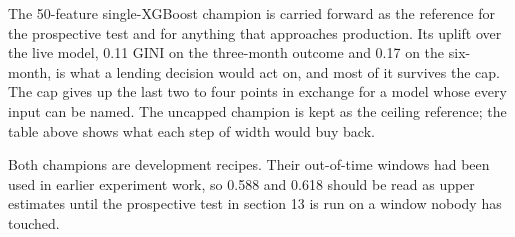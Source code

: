 The 50-feature single-XGBoost champion is carried forward as the reference for the prospective test and for anything that approaches production. Its uplift over the live model, 0.11 GINI on the three-month outcome and 0.17 on the six-month, is what a lending decision would act on, and most of it survives the cap. The cap gives up the last two to four points in exchange for a model whose every input can be named. The uncapped champion is kept as the ceiling reference; the table above shows what each step of width would buy back.

\begin{tcolorbox}[colback=BlueTint,colframe=Blue,boxrule=0pt,leftrule=2pt,arc=3mm]
Both champions are development recipes. Their out-of-time windows had been used in earlier experiment work, so 0.588 and 0.618 should be read as upper estimates until the prospective test in section 13 is run on a window nobody has touched.
\end{tcolorbox}
